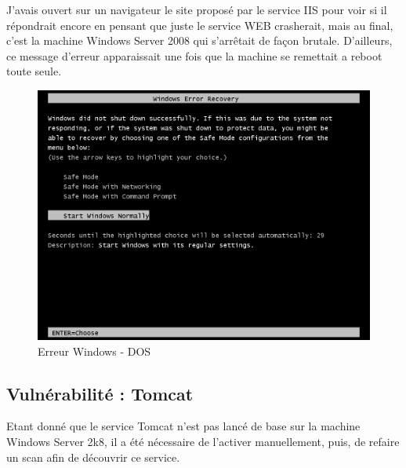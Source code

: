 \documentclass[a4paper]{article}
\begin{document}
J'avais ouvert sur un navigateur le site proposé par le service IIS pour voir si il répondrait encore en pensant que juste le service WEB crasherait, mais au final, c'est la machine Windows Server 2008
qui s'arrêtait de façon brutale. D'ailleurs, ce message d'erreur apparaissait une fois que la machine se remettait a reboot toute seule.
\begin{figure}[H]
  \centering
  \includegraphics[width=13cm]{images/Rapport/kali/W2k8/iis/3.png}
  \caption{Erreur Windows - DOS}
\end{figure}

\subsection{Vulnérabilité : Tomcat}
Etant donné que le service Tomcat n'est pas lancé de base sur la machine Windows Server 2k8, il a été nécessaire de l'activer manuellement, puis, de refaire un scan afin de découvrir ce service.
\end{document}
